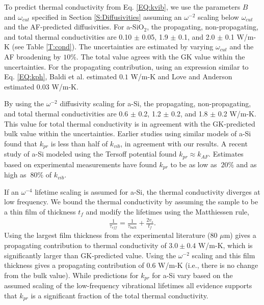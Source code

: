\documentclass[aps,prb,onecolumn,preprint,superscriptaddress,footinbib,amsmath,amssymb,floatfix]{revtex4}
\begin{document}
To predict thermal conductivity from Eq. \eqref{EQ:kvib}, 
we use the parameters $B$ and $\omega_{cut}$ specified 
in Section \ref{S:Diffusivities} assuming an $\omega^{-2}$ 
scaling below $\omega_{cut}$ and the AF-predicted diffusivities. 
For a-SiO$_2$, the propagating, non-propagating, and total thermal 
conductivities are 0.10 $\pm$ 0.05, 1.9 $\pm$ 0.1, 
and 2.0 $\pm$ 0.1 W/m-K (see Table \ref{T:cond}). The uncertainties 
are estimated by varying $\omega_{cut}$ and the AF 
broadening by $10\%$.  
The total value agrees with the GK value within the uncertainties. 
For the propagating contribution, 
using an expression similar to Eq. \eqref{EQ:kph}, 
Baldi et al.\cite{baldi_thermal_2008} estimated $0.1$ W/m-K and 
Love and Anderson\cite{love_estimate_1990} estimated 0.03 W/m-K.

By using the $\omega^{-2}$ diffusivity scaling for a-Si, 
the propagating, non-propagating, and total thermal conductivities 
are 0.6 $\pm$ 0.2, 1.2 $\pm$ 0.2, and 1.8 $\pm$ 0.2 W/m-K. 
This value for total thermal conductivity 
is in agreement with the GK-predicted bulk value within the 
uncertainties. Earlier studies using 
similar models of a-Si found 
that $k_{pr}$ is less than half of 
$k_{vib}$,\cite{feldman_thermal_1993,
feldman_numerical_1999} in agreement with our results.  
A recent study of a-Si modeled using the Tersoff potential found 
$k_{pr} \approx k_{AF}$.\cite{he_heat_2011} 
Estimates based on experimental measurements 
have found $k_{pr}$ to be as low 
as $~20\%$\cite{cahill_thermal_1994,feldman_numerical_1999} 
and as high as $~80\%$ of $k_{vib}$.
\cite{liu_high_2009,yang_anomalously_2010}

If an $\omega^{-4}$ lifetime scaling is assumed for a-Si, 
the thermal conductivity diverges at low frequency. We bound the 
thermal conductivity by assuming the sample to be a thin film 
of thickness $t_f$ and modify the lifetimes using the Matthiessen 
rule,\cite{ziman_electrons_2001} 
\begin{equation}\label{EQ:LambdaMatth}
\begin{split}
\frac{1}{\tau_{eff}} = \frac{1}{\tau_{bulk}} + 
\frac{2v_s}{t_f}.
\end{split}
\end{equation}
Using the largest film thickness from the experimental 
literature ($80$ $\mu$m)\cite{liu_high_2009} 
gives a propagating contribution 
to thermal conductivity of $3.0 \pm 0.4$ W/m-K, which is 
significantly larger than GK-predicted value. 
Using the $\omega^{-2}$ scaling and this film thickness 
gives a propagating contribution of 0.6 W/m-K (i.e., there is 
no change from the bulk value). 
While predictions for $k_{pr}$ for a-Si  
vary based on the assumed scaling of the low-frequency 
vibrational lifetimes
\cite{feldman_thermal_1993,cahill_thermal_1994,
feldman_numerical_1999,liu_high_2009,yang_anomalously_2010,
he_heat_2011} 
all evidence supports that $k_{pr}$ is a significant fraction 
of the total thermal conductivity.
\cite{feldman_thermal_1993,cahill_thermal_1994,
feldman_numerical_1999,liu_high_2009,
yang_anomalously_2010,
he_heat_2011,regner_broadband_2013}
\end{document}
